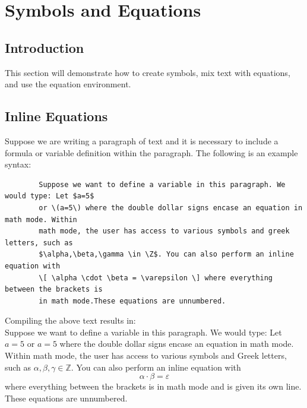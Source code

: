 \documentclass[]{article}
\newcommand{\bb}[1]{\mathbb{#1}} %
\newcommand{\Z}{\bb{Z}} %
\newcommand{\dent}{\hspace{\parindent}} %
\begin{document}
    \section{Symbols and Equations}
    \subsection{Introduction}
    This section will demonstrate how to create symbols, mix text with equations, and use the equation environment.
    \subsection{Inline Equations}
    \dent Suppose we are writing a paragraph of text and it is necessary to include a formula or variable definition within the paragraph. The following is an example syntax:
    \begin{verbatim}
        Suppose we want to define a variable in this paragraph. We would type: Let $a=5$
        or \(a=5\) where the double dollar signs encase an equation in math mode. Within 
        math mode, the user has access to various symbols and greek letters, such as 
        $\alpha,\beta,\gamma \in \Z$. You can also perform an inline equation with 
        \[ \alpha \cdot \beta = \varepsilon \] where everything between the brackets is 
        in math mode.These equations are unnumbered.
    \end{verbatim}
    Compiling the above text results in: \\
    \dent Suppose we want to define a variable in this paragraph. We would type: Let $a=5$ or \(a=5\) where the double dollar signs encase an equation in math mode. Within math mode, the user has access to various symbols and Greek letters, such as $\alpha,\beta,\gamma \in \Z$. You can also perform an inline equation with \[ \alpha \cdot \beta = \varepsilon \] where everything between the brackets is in math mode and is given its own line. These equations are unnumbered.
\end{document}
